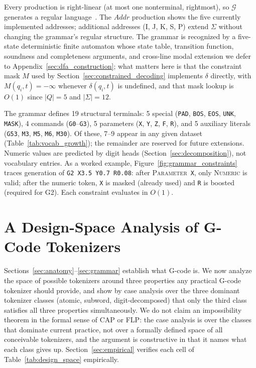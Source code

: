 \documentclass[11pt]{article}
\begin{document}
\noindent Every production is right-linear (at most one nonterminal, rightmost), so $\mathcal{G}$ generates a regular language~\cite{sipser}. The $\mathit{Addr}$ production shows the five currently implemented addresses; additional addresses (I, J, K, S, P) extend $\Sigma$ without changing the grammar's regular structure. The grammar is recognized by a five-state deterministic finite automaton whose state table, transition function, soundness and completeness arguments, and cross-line modal extension we defer to Appendix~\ref{sec:dfa_construction}; what matters here is that the constraint mask $M$ used by Section~\ref{sec:constrained_decoding} implements $\delta$ directly, with $M(q_i, t) = -\infty$ whenever $\delta(q_i, t)$ is undefined, and that mask lookup is $O(1)$ since $|Q| = 5$ and $|\Sigma| = 12$.

The grammar defines 19 structural terminals: 5 special (\texttt{PAD}, \texttt{BOS}, \texttt{EOS}, \texttt{UNK}, \texttt{MASK}), 4 commands (\texttt{G0}--\texttt{G3}), 5 parameters (\texttt{X}, \texttt{Y}, \texttt{Z}, \texttt{F}, \texttt{R}), and 5 auxiliary literals (\texttt{G53}, \texttt{M3}, \texttt{M5}, \texttt{M6}, \texttt{M30}). Of these, 7--9 appear in any given dataset (Table~\ref{tab:vocab_growth}); the remainder are reserved for future extensions. Numeric values are predicted by digit heads (Section~\ref{sec:decomposition}), not vocabulary entries. As a worked example, Figure~\ref{fig:grammar_constraints} traces generation of \texttt{G2 X3.5 Y0.7 R0.08}: after \textsc{Parameter}~\texttt{X}, only \textsc{Numeric} is valid; after the numeric token, \texttt{X} is masked (already used) and \texttt{R} is boosted (required for G2). Each constraint evaluates in $O(1)$.

\section{A Design-Space Analysis of G-Code Tokenizers}
\label{sec:design_space}

Sections~\ref{sec:anatomy}--\ref{sec:grammar} establish what G-code is. We now analyze the space of possible tokenizers around three properties any practical G-code tokenizer should provide, and show by case analysis over the three dominant tokenizer classes (atomic, subword, digit-decomposed) that only the third class satisfies all three properties simultaneously. We do not claim an impossibility theorem in the formal sense of CAP or FLP: the case analysis is over the classes that dominate current practice, not over a formally defined space of all conceivable tokenizers, and the argument is constructive in that it names what each class gives up. Section~\ref{sec:empirical} verifies each cell of Table~\ref{tab:design_space} empirically.
\end{document}

